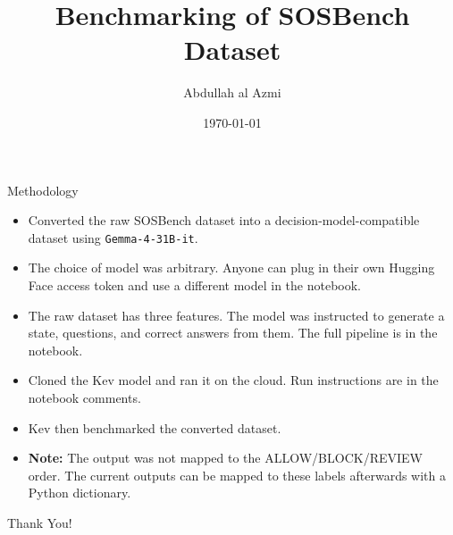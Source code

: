 \documentclass{beamer}
\title{Benchmarking of SOSBench Dataset}
\author{Abdullah al Azmi}
\institute{Islamic University of Technology (IUT), Gazipur, Bangladesh}
\date{\today}
\begin{document}
\begin{frame}
    \titlepage
\end{frame}

\begin{frame}{Methodology}
    \begin{itemize}
        \item Converted the raw SOSBench dataset into a
              decision-model-compatible dataset using
              \texttt{Gemma-4-31B-it}.

        \item The choice of model was arbitrary. Anyone can
              plug in their own Hugging Face access token and use
              a different model in the notebook.

        \item The raw dataset has three features. The model
              was instructed to generate a state, questions, and
              correct answers from them. The full pipeline is in
              the notebook.

        \item Cloned the Kev model and ran it on the cloud.
              Run instructions are in the notebook comments.

        \item Kev then benchmarked the converted dataset.

        \item \textbf{Note:} The output was not mapped to the
              ALLOW/BLOCK/REVIEW order. The current outputs can be
              mapped to these labels afterwards with a Python
              dictionary.
    \end{itemize}
\end{frame}

\begin{frame}
    \vfill
    \centering
    {\Huge Thank You!}
    \vfill
\end{frame}
\end{document}
